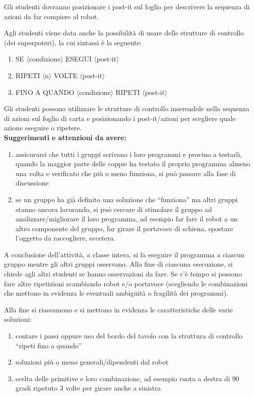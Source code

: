 \documentclass[12pt]{article}
\begin{document}
Gli studenti dovranno posizionare i post-it sul foglio per descrivere la sequenza di azioni da far compiere al robot.

Agli studenti viene data anche la possibilità di usare delle strutture di controllo (dei superpoteri), la cui sintassi è la seguente:
\begin{enumerate}
\item SE $\langle$condizione$\rangle$ ESEGUI $\langle$post-it$\rangle$
\item RIPETI $\langle$n$\rangle$ VOLTE $\langle$post-it$\rangle$
\item FINO A QUANDO $\langle$condizione$\rangle$ RIPETI $\langle$post-it$\rangle$
\end{enumerate}

Gli studenti possono utilizzare le strutture di controllo inserendole nella sequenza di azioni sul foglio di carta e posizionando i post-it/azioni per scegliere quale azione eseguire o ripetere.\\

\textbf{Suggerimenti e attenzioni da avere:}
\begin{enumerate}
\item assicurarsi che tutti i gruppi scrivano i loro programmi e provino a testarli, quando la maggior parte delle coppie ha testato il proprio programma almeno una volta e verificato che più o meno funziona, si può passare alla fase di discussione
\item se un gruppo ha già definito una soluzione che “funziona” ma altri gruppi stanno ancora lavorando, si può cercare di stimolare il gruppo ad analizzare/migliorare il loro programma, ad esempio far fare il robot a un altro componente del gruppo, far girare il portavoce di schiena, spostare l’oggetto da raccogliere, eccetera.
\end{enumerate}

A conclusione dell’attività, a classe intera, si fa eseguire il programma a ciascun gruppo mentre gli altri gruppi osservano. Alla fine di ciascuna esecuzione, si chiede agli altri studenti se hanno osservazioni da fare. Se c’è tempo si possono fare altre ripetizioni scambiando robot e/o portavoce (scegliendo le combinazioni che mettono in evidenza le eventuali ambiguità o fragilità dei programmi).

Alla fine si riassumono e si mettono in evidenza le caratteristiche delle varie soluzioni:
\begin{enumerate}
\item contare i passi oppure uso del bordo del tavolo con la struttura di controllo “ripeti fino a quando”
\item soluzioni più o meno generali/dipendenti dal robot
\item scelta delle primitive e loro combinazione,  ad esempio ruota a destra di 90 gradi ripetuto 3 volte per girare anche a sinistra
\end{enumerate}
\end{document}
